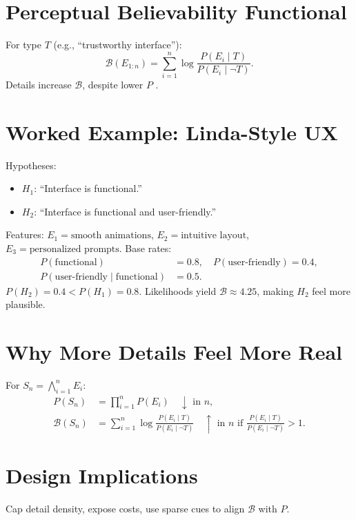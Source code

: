\documentclass[openany]{book}
\begin{document}
{{\section{Perceptual Believability Functional}
\label{sec:conj-believability}
For type \(T\) (e.g., \textquotedblleft trustworthy interface\textquotedblright):
\begin{equation}
\label{eq:believability-functional}
\mathcal{B}(E_{1:n}) = \sum_{i=1}^n \log \frac{P(E_i \mid T)}{P(E_i \mid \neg T)}.
\end{equation}
Details increase \(\mathcal{B}\), despite lower \(P\) \citep{tversky1983}.

\section{Worked Example: Linda-Style UX}
\label{sec:conj-example}
Hypotheses:
\begin{itemize}
  \item \(H_1\): \textquotedblleft Interface is functional.\textquotedblright
  \item \(H_2\): \textquotedblleft Interface is functional and user-friendly.\textquotedblright
\end{itemize}
Features: \(E_1 = \text{smooth animations}\), \(E_2 = \text{intuitive layout}\), \(E_3 = \text{personalized prompts}\). Base rates:
\begin{align*}
P(\text{functional}) &= 0.8, \quad P(\text{user-friendly}) = 0.4, \\
P(\text{user-friendly} \mid \text{functional}) &= 0.5.
\end{align*}
\(P(H_2) = 0.4 < P(H_1) = 0.8\). Likelihoods yield \(\mathcal{B} \approx 4.25\), making \(H_2\) feel more plausible.

\section{Why More Details Feel More Real}
\label{sec:conj-why}
For \(S_n = \bigwedge_{i=1}^n E_i\):
\begin{align*}
P(S_n) &= \prod_{i=1}^n P(E_i) \quad \downarrow \text{ in } n, \\
\mathcal{B}(S_n) &= \sum_{i=1}^n \log \frac{P(E_i \mid T)}{P(E_i \mid \neg T)} \quad \uparrow \text{ in } n \text{ if } \frac{P(E_i \mid T)}{P(E_i \mid \neg T)} > 1.
\end{align*}

\section{Design Implications}
\label{sec:conj-implications}
Cap detail density, expose costs, use sparse cues to align \(\mathcal{B}\) with \(P\).

}}
\end{document}

